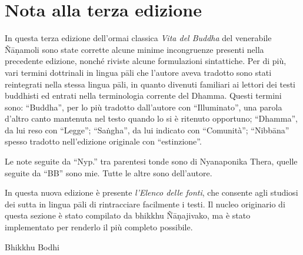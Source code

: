 \chapter{Nota alla terza edizione}

In questa terza edizione dell’ormai classica \emph{Vita del Buddha} del
venerabile Ñāṇamoli sono state corrette alcune minime incongruenze
presenti nella precedente edizione, nonché riviste alcune formulazioni
sintattiche. Per di più, vari termini dottrinali in lingua pāli che
l’autore aveva tradotto sono stati reintegrati nella stessa lingua pāli,
in quanto divenuti familiari ai lettori dei testi buddhisti ed entrati
nella terminologia corrente del Dhamma. Questi termini sono: “Buddha”,
per lo più tradotto dall’autore con “Illuminato”, una parola d’altro
canto mantenuta nel testo quando lo si è ritenuto opportuno; “Dhamma”,
da lui reso con “Legge”; “Saṅgha”, da lui indicato con “Comunità”;
“Nibbāna” spesso tradotto nell’edizione originale con “estinzione”.

Le note seguite da “Nyp.” tra parentesi tonde sono di Nyanaponika Thera,
quelle seguite da “BB” sono mie. Tutte le altre sono dell’autore.

In questa nuova edizione è presente \emph{l’Elenco delle fonti}, che
consente agli studiosi dei sutta in lingua pāli di rintracciare
facilmente i testi. Il nucleo originario di questa sezione è stato
compilato da bhikkhu Ñāṇajivako, ma è stato implementato per renderlo il
più completo possibile.

\bigskip

{\raggedleft
Bhikkhu Bodhi
\par}


